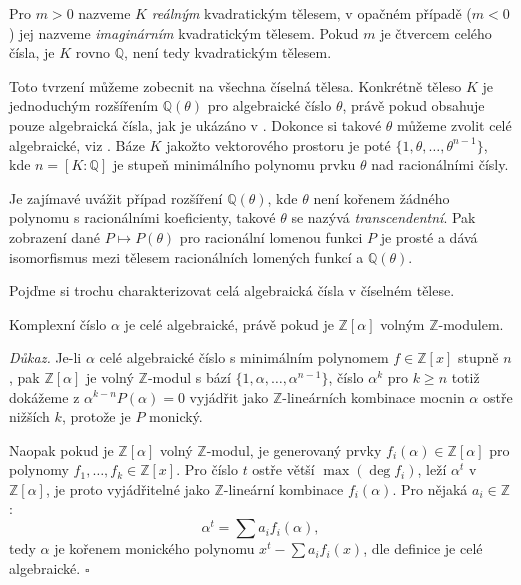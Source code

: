 \documentclass[12pt]{report}
\begin{document}
Pro $m > 0$ nazveme $K$ \textit{reálným} kvadratickým tělesem, v opačném případě ($m < 0$) jej nazveme \textit{imaginárním} kvadratickým tělesem. Pokud $m$ je čtvercem celého čísla, je $K$ rovno $\mathbb{Q}$, není tedy kvadratickým tělesem.

Toto tvrzení můžeme zobecnit na všechna číselná tělesa. Konkrétně těleso $K$ je jednoduchým rozšířením $\mathbb{Q}(\theta)$ pro algebraické číslo $\theta$, právě pokud obsahuje pouze algebraická čísla, jak je ukázáno v \cite[Věta 11.12]{Rosicky}. Dokonce si takové $\theta$ můžeme zvolit celé algebraické, viz \cite[Lemma 4.3.8]{Perutka}. Báze $K$ jakožto vektorového prostoru je poté $\lbrace 1,\theta,\dots,\theta ^{n-1} \rbrace$, kde $n = [K : \mathbb{Q}]$ je stupeň minimálního polynomu prvku $\theta$ nad racionálními čísly. 

\begin{poznamka} 
Je zajímavé uvážit případ rozšíření $\mathbb{Q}(\theta)$, kde $\theta$ není kořenem žádného polynomu s racionálními koeficienty, takové $\theta$ se nazývá \textit{transcendentní}. Pak zobrazení dané $P \mapsto P(\theta)$ pro racionální lomenou funkci $P$ je prosté a dává isomorfismus mezi tělesem racionálních lomených funkcí a $\mathbb{Q}(\theta)$.
\end{poznamka}

Pojďme si trochu charakterizovat celá algebraická čísla v číselném tělese.

\begin{veta}\label{alg}
Komplexní číslo $\alpha$ je celé algebraické, právě pokud je $\mathbb{Z}[\alpha]$ volným $\mathbb{Z}$-modulem.
\end{veta}
\noindent \textit{Důkaz.} Je-li $\alpha$ celé algebraické číslo s minimálním polynomem $f \in \mathbb{Z}[x]$ stupně $n$, pak $\mathbb{Z}[\alpha]$ je volný $\mathbb{Z}$-modul s bází $\lbrace 1,\alpha,\dots,\alpha^{n-1} \rbrace$, číslo $\alpha^k$ pro $k\geqslant n$ totiž dokážeme z $\alpha^{k-n} P(\alpha) = 0$ vyjádřit jako $\mathbb{Z}$-lineárních kombinace mocnin $\alpha$ ostře nižších $k$, protože je $P$ monický.

Naopak pokud je $\mathbb{Z}[\alpha]$ volný $\mathbb{Z}$-modul, je generovaný prvky $f_i(\alpha) \in \mathbb{Z}[\alpha]$ pro polynomy $f_1,\dots,f_k \in \mathbb{Z}[x]$. Pro číslo $t$ ostře větší $\max{(\deg f_i)}$, leží $\alpha^t$ v $\mathbb{Z}[\alpha]$, je proto vyjádřitelné jako $\mathbb{Z}$-lineární kombinace $f_i(\alpha)$. Pro nějaká $a_i \in \mathbb{Z}$:
\begin{equation*}
\alpha^t = \sum a_i f_i(\alpha),
\end{equation*}
tedy $\alpha$ je kořenem monického polynomu $x^t - \sum a_i f_i(x)$, dle definice je celé algebraické. \hfill $\square$\\
\end{document}
